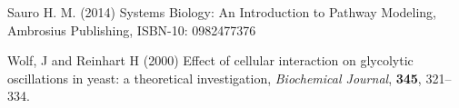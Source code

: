 \documentclass{bioinfo}
\begin{document}
\begin{thebibliography}{}
 Sauro H. M. (2014) Systems Biology: An Introduction to Pathway Modeling, Ambrosius Publishing, ISBN-10: 0982477376

 Wolf, J and Reinhart H (2000) Effect of cellular interaction on glycolytic oscillations in yeast: a theoretical investigation, {\it Biochemical Journal}, {\bf 345}, 321--334.










\end{thebibliography}
\end{document}
